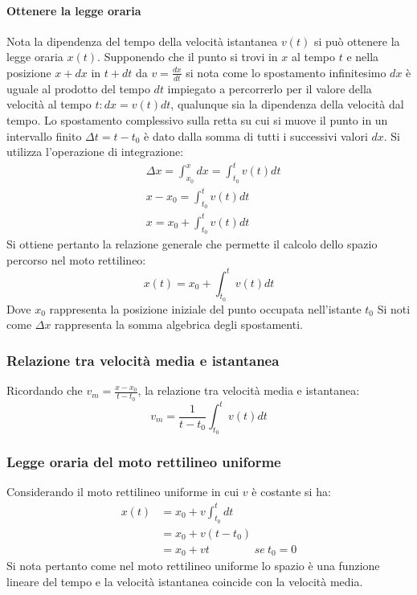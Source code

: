 			\paragraph{Ottenere la legge oraria}
			Nota la dipendenza del tempo della velocit\`a istantanea $v(t)$ si pu\`o ottenere la legge oraria $x(t)$.
			Supponendo che il punto si trovi in $x$ al tempo $t$ e nella posizione $x+dx$ in $t+dt$ da $v=\frac{dx}{dt}$ si nota come lo spostamento infinitesimo $dx$ \`e uguale al prodotto del tempo $dt$ impiegato a percorrerlo per il valore della velocit\`a al tempo $t:dx=v(t)dt$, qualunque sia la dipendenza della velocit\`a dal tempo.
			Lo spostamento complessivo sulla retta su cui si muove il punto in un intervallo finito $\Delta t = t - t_0$ \`e dato dalla somma di tutti i successivi valori $dx$.
			Si utilizza l'operazione di integrazione:
			\begin{align*}
				&\Delta x = \int_{x_0}^x dx = \int_{t_0}^t v(t)dt\\
				&x - x_0 = \int_{t_0}^t v(t)dt\\
				&x = x_0 +\int_{t_0}^tv(t)dt
			\end{align*}
			Si ottiene pertanto la relazione generale che permette il calcolo dello spazio percorso nel moto rettilineo:
			$$x(t) = x_0 + \int_{t_0}^t v(t)dt$$
			Dove $x_0$ rappresenta la posizione iniziale del punto occupata nell'istante $t_0$
			Si noti come $\Delta x$ rappresenta la somma algebrica degli spostamenti.

		\subsubsection{Relazione tra velocit\`a media e istantanea}
		Ricordando che $v_m = \frac{x-x_0}{t-t_0}$, la relazione tra velocit\`a media e istantanea:
		$$v_m = \dfrac{1}{t-t_0}\int_{t_0}^{t}v(t)dt$$

		\subsubsection{Legge oraria del moto rettilineo uniforme}
		Considerando il moto rettilineo uniforme in cui $v$ \`e costante si ha:
		\begin{align*}
			x(t) &= x_0 + v\int_{t_0}^t dt\\
			     &=x_0 + v(t-t_0)\\
			     &=x_0 + vt\qquad\qquad se\ t_0 = 0
		\end{align*}
		Si nota pertanto come nel moto rettilineo uniforme lo spazio \`e una funzione lineare del tempo e la velocit\`a istantanea coincide con la velocit\`a media.

